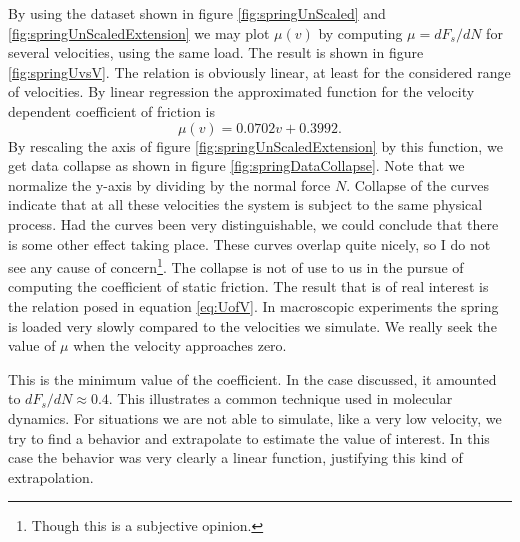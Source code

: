 \documentclass[twoside,english]{uiofysmaster}
\begin{document}
By using the dataset shown in figure \ref{fig:springUnScaled} and \ref{fig:springUnScaledExtension} we may plot $\mu(v)$ by computing $\mu = dF_s/dN$ for several velocities, using the same load.
The result is shown in figure \ref{fig:springUvsV}. 
The relation is obviously linear, at least for the considered range of velocities. 
By linear regression the approximated function for the velocity dependent coefficient of friction is 
\begin{equation}\label{eq:UofV}
	\mu(v) = 0.0702v + 0.3992.
\end{equation}
By rescaling the axis of figure \ref{fig:springUnScaledExtension} 
by this function, we get data collapse as shown in figure \ref{fig:springDataCollapse}. 
Note that we normalize the y-axis by dividing by the normal force $N$.
Collapse of the curves indicate that at all these velocities the system is subject to the same physical process. 
Had the curves been very distinguishable, we could conclude that there is some other effect taking place. 
These curves overlap quite nicely, so I do not see any cause of concern\footnote{Though this is a subjective opinion.}.
The collapse is not of use to us in the pursue of computing the coefficient of static friction. 
The result that is of real interest is the relation posed in equation \eqref{eq:UofV}. 
In macroscopic experiments the spring is loaded very slowly compared to the velocities we simulate. 
We really seek the value of $\mu$ when the velocity approaches zero.

This is the minimum value of the coefficient. 
In the case discussed, it amounted to $dF_s/dN \approx 0.4$.
This illustrates a common technique used in molecular dynamics. 
For situations we are not able to simulate, like a very low velocity, we try to find a behavior and extrapolate to estimate the value of interest. 
In this case the behavior was very clearly a linear function, justifying this kind of extrapolation. 
\end{document}
